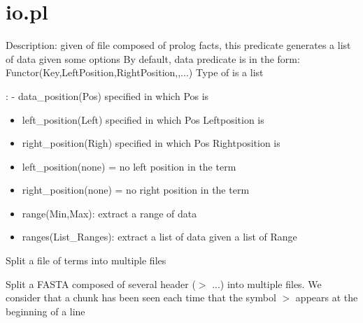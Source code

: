 


\section{io.pl}

\label{sec:io}

\begin{description}
Description: given of file composed of prolog facts,
this predicate generates a list of data given some options
By default, data predicate is in the form:
Functor(Key,LeftPosition,RightPosition,,...)
Type of  is a list

: - data_position(Pos) specified in which Pos  is

\begin{itemize}
    \item left_position(Left) specified in which Pos Leftposition is
    \item right_position(Righ) specified in which Pos Rightposition is
    \item left_position(none) = no left position in the term
    \item right_position(none) = no right position in the term
    \item range(Min,Max): extract a range of data
    \item ranges(List_Ranges): extract a list of data given a list of Range
\end{itemize}

Split a file of terms into multiple files

Split a FASTA composed of several header ($>$ ...) into multiple files. We consider that a chunk
has been seen each time that the symbol $>$ appears at the beginning of a line
\end{description}

